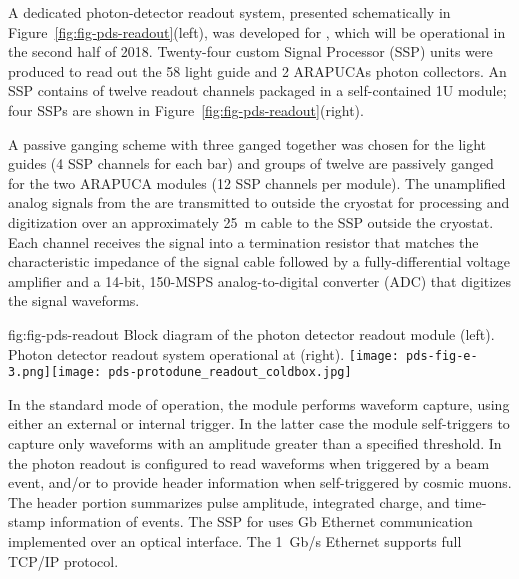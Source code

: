 A dedicated photon-detector readout system, presented schematically  in Figure~\ref{fig:fig-pds-readout}(left), was developed for , which will be operational in the second half of \num{2018}.  Twenty-four custom  Signal Processor (SSP) units were produced to read out the 58 light guide and 2 ARAPUCAs photon collectors.  
An SSP contains of twelve readout channels packaged in  a self-contained 1U module; four SSPs are shown in Figure~\ref{fig:fig-pds-readout}(right).

A passive ganging scheme with three  ganged together was chosen for the light guides (4 SSP channels for each bar) and groups of twelve  are passively ganged for the two ARAPUCA modules (12 SSP channels per module).  The unamplified analog signals from the  are transmitted to outside the cryostat for processing and digitization over an approximately \SI{25}{m} cable to the SSP outside the cryostat. 
 Each channel receives the  signal into a termination resistor that matches the characteristic impedance of the signal cable followed by a fully-differential voltage amplifier and a \num{14}-bit, \num{150}-MSPS analog-to-digital converter (ADC) that digitizes the  signal waveforms. 
  

 \begin{dunefigure}
 {fig:fig-pds-readout}
 {Block diagram of the  photon detector readout module (left). Photon detector readout system operational at  (right). }
\texttt{[image: pds-fig-e-3.png]}\texttt{[image: pds-protodune\_readout\_coldbox.jpg]}
\end{dunefigure}

In the standard mode of operation, the module performs waveform capture, using either an external or internal trigger. In the latter case the 
module self-triggers to capture only waveforms with an amplitude greater than a specified threshold. In  the photon readout 
is configured to read waveforms when triggered by a beam event, and/or to provide header information when self-triggered by cosmic muons.
The header portion summarizes pulse amplitude, integrated charge, and time-stamp information of events. The SSP for  uses \si{Gb} Ethernet 
communication implemented over an optical interface. The \SI{1}{Gb/s} Ethernet supports full TCP/IP protocol.  

